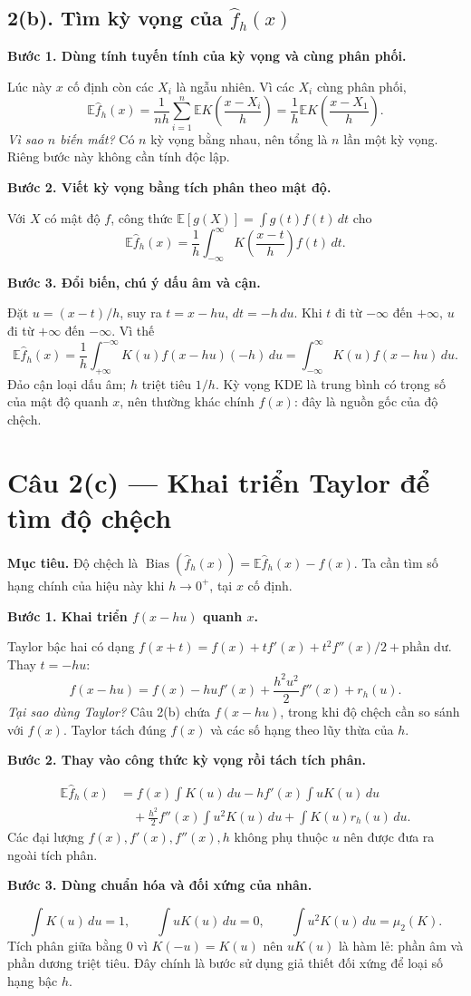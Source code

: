 \documentclass[11pt,a4paper]{article}
\newcommand{\E}{\mathbb E}
\newcommand{\fh}{\widehat f_h}
\DeclareMathOperator{\Bias}{Bias}
\newcommand{\buoc}[1]{\par\medskip\textbf{#1}\par}
\begin{document}
\subsection*{2(b). Tìm kỳ vọng của $\widehat f_h(x)$}
\buoc{Bước 1. Dùng tính tuyến tính của kỳ vọng và cùng phân phối.}
Lúc này $x$ cố định còn các $X_i$ là ngẫu nhiên. Vì các $X_i$ cùng phân phối,
\[
\E\fh(x)=\frac1{nh}\sum_{i=1}^n\E K\!\left(\frac{x-X_i}{h}\right)
=\frac1h\E K\!\left(\frac{x-X_1}{h}\right).
\]
\textit{Vì sao $n$ biến mất?} Có $n$ kỳ vọng bằng nhau, nên tổng là $n$ lần một kỳ vọng. Riêng bước này không cần tính độc lập.

\buoc{Bước 2. Viết kỳ vọng bằng tích phân theo mật độ.}
Với $X$ có mật độ $f$, công thức $\E[g(X)]=\int g(t)f(t)\,dt$ cho
\[
\E\fh(x)=\frac1h\int_{-\infty}^{\infty}K\!\left(\frac{x-t}{h}\right)f(t)\,dt.
\]
\buoc{Bước 3. Đổi biến, chú ý dấu âm và cận.}
Đặt $u=(x-t)/h$, suy ra $t=x-hu$, $dt=-h\,du$. Khi $t$ đi từ $-\infty$ đến $+\infty$, $u$ đi từ $+\infty$ đến $-\infty$. Vì thế
\[
\E\fh(x)=\frac1h\int_{+\infty}^{-\infty}K(u)f(x-hu)(-h)\,du
=\boxed{\int_{-\infty}^{\infty}K(u)f(x-hu)\,du}.
\]
Đảo cận loại dấu âm; $h$ triệt tiêu $1/h$. Kỳ vọng KDE là trung bình có trọng số của mật độ quanh $x$, nên thường khác chính $f(x)$: đây là nguồn gốc của độ chệch.

\clearpage
\section*{Câu 2(c) — Khai triển Taylor để tìm độ chệch}
\textbf{Mục tiêu.} Độ chệch là $\Bias(\fh(x))=\E\fh(x)-f(x)$. Ta cần tìm số hạng chính của hiệu này khi $h\to0^+$, tại $x$ cố định.

\buoc{Bước 1. Khai triển $f(x-hu)$ quanh $x$.}
Taylor bậc hai có dạng $f(x+t)=f(x)+tf'(x)+t^2f''(x)/2+\text{phần dư}$. Thay $t=-hu$:
\[
f(x-hu)=f(x)-hu f'(x)+\frac{h^2u^2}{2}f''(x)+r_h(u).
\]
\textit{Tại sao dùng Taylor?} Câu 2(b) chứa $f(x-hu)$, trong khi độ chệch cần so sánh với $f(x)$. Taylor tách đúng $f(x)$ và các số hạng theo lũy thừa của $h$.

\buoc{Bước 2. Thay vào công thức kỳ vọng rồi tách tích phân.}
\begin{align*}
\E\fh(x)
&=f(x)\int K(u)\,du-hf'(x)\int uK(u)\,du\\
&\quad+\frac{h^2}{2}f''(x)\int u^2K(u)\,du+\int K(u)r_h(u)\,du.
\end{align*}
Các đại lượng $f(x),f'(x),f''(x),h$ không phụ thuộc $u$ nên được đưa ra ngoài tích phân.

\buoc{Bước 3. Dùng chuẩn hóa và đối xứng của nhân.}
\[
\int K(u)\,du=1,\qquad \int uK(u)\,du=0,\qquad
\int u^2K(u)\,du=\mu_2(K).
\]
Tích phân giữa bằng 0 vì $K(-u)=K(u)$ nên $uK(u)$ là hàm lẻ: phần âm và phần dương triệt tiêu. Đây chính là bước sử dụng giả thiết đối xứng để loại số hạng bậc $h$.
\end{document}
